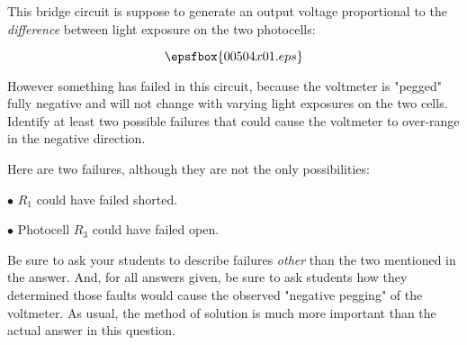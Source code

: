 

This bridge circuit is suppose to generate an output voltage proportional to the {\it difference} between light exposure on the two photocells:

$$\epsfbox{00504x01.eps}$$

However something has failed in this circuit, because the voltmeter is "pegged" fully negative and will not change with varying light exposures on the two cells.  Identify at least two possible failures that could cause the voltmeter to over-range in the negative direction.







Here are two failures, although they are not the only possibilities:

\medskip
\item{$\bullet$} $R_1$ could have failed shorted.
\item{$\bullet$} Photocell $R_3$ could have failed open.
\medskip







Be sure to ask your students to describe failures {\it other} than the two mentioned in the answer.  And, for all answers given, be sure to ask students how they determined those faults would cause the observed "negative pegging" of the voltmeter.  As usual, the method of solution is much more important than the actual answer in this question.




